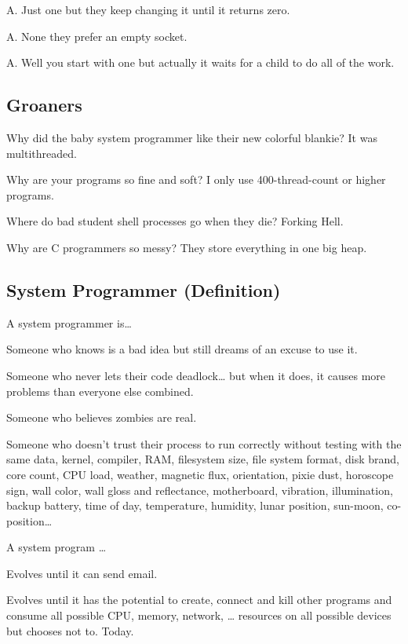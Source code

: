 A. Just one but they keep changing it until it returns zero.

A. None they prefer an empty socket.

A. Well you start with one but actually it waits for a child to do all of the work.

\subsection{Groaners}

Why did the baby system programmer like their new colorful blankie? It was multithreaded.

Why are your programs so fine and soft? I only use 400-thread-count or higher programs.

Where do bad student shell processes go when they die? Forking Hell.

Why are C programmers so messy? They store everything in one big heap.

\subsection{System Programmer (Definition)}

A system programmer is\ldots{}

Someone who knows  is a bad idea but still dreams of an excuse to use it.

Someone who never lets their code deadlock\ldots{} but when it does, it causes more problems than everyone else combined.

Someone who believes zombies are real.

Someone who doesn't trust their process to run correctly without testing with the same data, kernel, compiler, RAM, filesystem size, file system format, disk brand, core count, CPU load, weather, magnetic flux, orientation, pixie dust, horoscope sign, wall color, wall gloss and reflectance, motherboard, vibration, illumination, backup battery, time of day, temperature, humidity, lunar position, sun-moon, co-position\ldots{}

A system program \ldots{}

Evolves until it can send email.

Evolves until it has the potential to create, connect and kill other programs and consume all possible CPU, memory, network, \ldots{} resources on all possible devices but chooses not to. Today.



